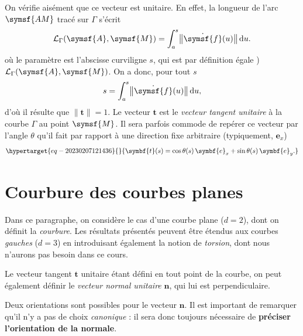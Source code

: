 \documentclass[
  a4paper,
  DIV=11,
  numbers=noendperiod]{scrreprt}
\newcommand{\D}{{\mathrm d}}
\newcommand{\point}[1]{\symsf{#1}}
\renewcommand{\vec}[1]{\symbf{#1}}
\begin{document}
On vérifie aisément que ce vecteur est unitaire. En effet, la longueur
de l'arc \(\point{AM}\) tracé sur \(\Gamma\) s'écrit \[
\mathcal{L}_\Gamma(\point{A}, \point{M}) = \int_a^s \bigl \lVert  \dot{\point{f}}(u) \bigr \rVert \, \D u.
\] où le paramètre est l'abscisse curviligne \(s\), qui est par
définition égale ) \(\mathcal{L}_\Gamma(\point{A}, \point{M})\). On a
donc, pour tout \(s\) \[
s = \int_a^s \bigl \lVert  \dot{\point{f}}(u) \bigr \rVert \, \D u,
\] d'où il résulte que \(\lVert \vec t \rVert = 1\). Le vecteur
\(\vec t\) est le \emph{vecteur tangent unitaire} à la courbe \(\Gamma\)
au point \(\point{M}\). Il sera parfois commode de repérer ce vecteur
par l'angle \(\theta\) qu'il fait par rapport à une direction fixe
arbitraire (typiquement, \(\vec e_x\))
\begin{equation}\protect\hypertarget{eq-20230207121436}{}{
\vec t(s) = \cos \theta(s) \, \vec e_x + \sin \theta(s) \, \vec e_y.
}\label{eq-20230207121436}\end{equation}

\hypertarget{sec-20230214055209}{%
\section{Courbure des courbes planes}\label{sec-20230214055209}}

Dans ce paragraphe, on considère le cas d'une courbe plane (\(d = 2\)),
dont on définit la \emph{courbure}. Les résultats présentés peuvent être
étendus aux courbes \emph{gauches} (\(d = 3\)) en introduisant également
la notion de \emph{torsion}, dont nous n'aurons pas besoin dans ce
cours.

Le vecteur tangent \(\vec t\) unitaire étant défini en tout point de la
courbe, on peut également définir le \emph{vecteur normal unitaire}
\(\vec n\), qui lui est perpendiculaire.

\begin{tcolorbox}[enhanced jigsaw, toprule=.15mm, breakable, left=2mm, rightrule=.15mm, colbacktitle=quarto-callout-note-color!10!white, colframe=quarto-callout-note-color-frame, title=\textcolor{quarto-callout-note-color}{\faInfo}\hspace{0.5em}{Note}, bottomtitle=1mm, arc=.35mm, coltitle=black, opacityback=0, leftrule=.75mm, titlerule=0mm, toptitle=1mm, bottomrule=.15mm, opacitybacktitle=0.6, colback=white]

Deux orientations sont possibles pour le vecteur \(\vec n\). Il est
important de remarquer qu'il n'y a pas de choix \emph{canonique} : il
sera donc toujours nécessaire de \textbf{préciser l'orientation de la
normale}.

\end{tcolorbox}
\end{document}
